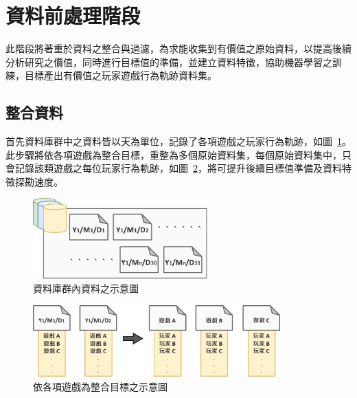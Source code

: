 \section{資料前處理階段}
\label{sec:DataPreProcess}

此階段將著重於資料之整合與過濾，為求能收集到有價值之原始資料，以提高後續分析研究之價值，同時進行目標值的準備，並建立資料特徵，協助機器學習之訓練，目標產出有價值之玩家遊戲行為軌跡資料集。

\subsection{整合資料}
\label{subsec:DataIntegration}

首先資料庫群中之資料皆以天為單位，記錄了各項遊戲之玩家行為軌跡，如圖~\ref{fig:Image_Databases}。此步驟將依各項遊戲為整合目標，重整為多個原始資料集，每個原始資料集中，只會記錄該類遊戲之每位玩家行為軌跡，如圖~\ref{fig:Image_Integration}，將可提升後續目標值準備及資料特徵探勘速度。

\begin{figure}[!htb]
  \begin{center}
    \includegraphics[width=0.6\textwidth]{figures/Image_Databases.png}
    \caption[資料庫群內資料之示意圖]{資料庫群內資料之示意圖}
    \label{fig:Image_Databases}
  \end{center}
\end{figure}

\begin{figure}[!htb]
  \begin{center}
    \includegraphics[width=0.85\textwidth]{figures/Image_Integration.png}
    \caption[依各項遊戲為整合目標之示意圖]{依各項遊戲為整合目標之示意圖}
    \label{fig:Image_Integration}
  \end{center}
\end{figure}


